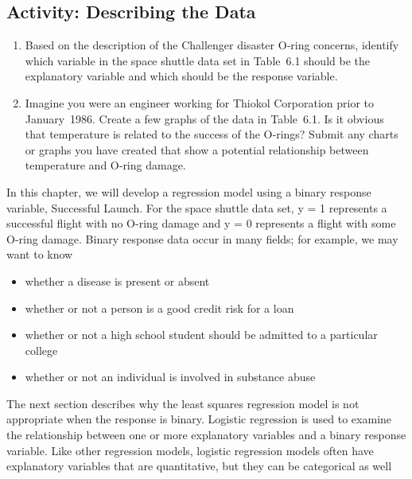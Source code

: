 \documentclass[
]{book}
\providecommand{\tightlist}{%
  \setlength{\itemsep}{0pt}\setlength{\parskip}{0pt}}
\begin{document}
\hypertarget{activity-describing-the-data-1}{%
\subsection*{Activity: Describing the Data}\label{activity-describing-the-data-1}}

\begin{enumerate}
\def\labelenumi{\arabic{enumi}.}
\item
  Based on the description of the Challenger disaster O‑ring concerns, identify which variable in the space shuttle data set in Table~6.1 should be the explanatory variable and which should be the response variable.
\item
  Imagine you were an engineer working for Thiokol Corporation prior to January~1986. Create a few graphs of the data in Table~6.1. Is it obvious that temperature is related to the success of the O‑rings? Submit any charts or graphs you have created that show a potential relationship between temperature and O‑ring damage.
\end{enumerate}

In this chapter, we will develop a regression model using a binary response variable, Successful Launch. For the space shuttle data set, y = 1 represents a successful flight with no O-ring damage and y = 0 represents a flight with some O-ring damage. Binary response data occur in many fields; for example, we may want to know

\begin{itemize}
\tightlist
\item
  whether a disease is present or absent
\item
  whether or not a person is a good credit risk for a loan
\item
  whether or not a high school student should be admitted to a particular college
\item
  whether or not an individual is involved in substance abuse
\end{itemize}

The next section describes why the least squares regression model is not appropriate when the response is binary. Logistic regression is used to examine the relationship between one or more explanatory variables and a binary response variable. Like other regression models, logistic regression models often have explanatory variables that are quantitative, but they can be categorical as well
\end{document}
